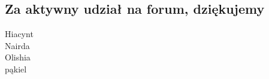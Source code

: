 \subsection*{Za aktywny udział na forum, dziękujemy}
\begin{multicols}{4}
Hiacynt \\
Nairda \\
Olishia \\
pąkiel
\end{multicols}
